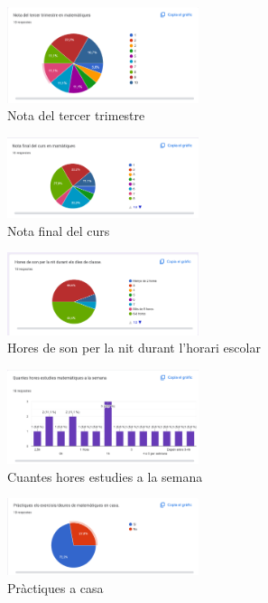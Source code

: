 \begin{figure}[H]
    \centering
    \includegraphics[width=0.5\textwidth]{./figures/15.png}
    \caption{Nota del tercer trimestre}
\end{figure}

\begin{figure}[H]
    \centering
    \includegraphics[width=0.5\textwidth]{./figures/16.png}
    \caption{Nota final del curs}
\end{figure}

\begin{figure}[H]
    \centering
    \includegraphics[width=0.5\textwidth]{./figures/17.png}
    \caption{Hores de son per la nit durant l'horari escolar}
\end{figure}

\begin{figure}[H]
    \centering
    \includegraphics[width=0.5\textwidth]{./figures/18.png}
    \caption{Cuantes hores estudies a la semana}
\end{figure}

\begin{figure}[H]
    \centering
    \includegraphics[width=0.5\textwidth]{./figures/19.png}
    \caption{Pràctiques a casa}
\end{figure}

